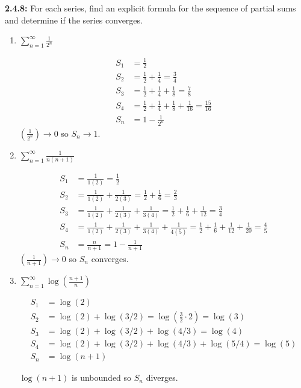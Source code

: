 \documentclass[12pt]{article}
\begin{document}
\textbf{2.4.8:} For each series, find an explicit formula for the sequence of partial sums and determine if the series converges.
\begin{enumerate}
    \item $\sum_{n=1}^{\infty} \frac{1}{2^n}$

        \color{blue}
            \begin{align*}
                S_1 &=  \frac{1}{2}\\
                S_2 &= \frac{1}{2} + \frac{1}{4} = \frac{3}{4}\\
                S_3 &= \frac{1}{2} + \frac{1}{4} + \frac{1}{8} = \frac{7}{8}\\
                S_4 &= \frac{1}{2} + \frac{1}{4} + \frac{1}{8} + \frac{1}{16} = \frac{15}{16}\\
                S_n &= 1 - \frac{1}{2^n}
            \end{align*}
            $(\frac{1}{2^n}) \to 0$ so $S_n \to 1$.
        \color{black}

    \item $\sum_{n=1}^{\infty} \frac{1}{n(n+1)}$
    
        \color{blue}
            \begin{align*}
                S_1 &= \frac{1}{1(2)} = \frac{1}{2}\\
                S_2 &= \frac{1}{1(2)} + \frac{1}{2(3)} = \frac{1}{2} + \frac{1}{6} = \frac{2}{3}\\
                S_3 &= \frac{1}{1(2)} + \frac{1}{2(3)} + \frac{1}{3(4)} = \frac{1}{2} + \frac{1}{6} + \frac{1}{12} = \frac{3}{4}\\
                S_4 &= \frac{1}{1(2)} + \frac{1}{2(3)} + \frac{1}{3(4)} + \frac{1}{4(5)} = \frac{1}{2} + \frac{1}{6} + \frac{1}{12} + \frac{1}{20} = \frac{4}{5}\\
                S_n &= \frac{n}{n+1} = 1 - \frac{1}{n+1}
            \end{align*}
            $(\frac{1}{n+1}) \to 0$ so $S_n$ converges. 
        \color{black}

    \item $\sum_{n=1}^{\infty} \log(\frac{n+1}{n})$
            
        \color{blue}
            \begin{align*}
                S_1 &= \log(2)\\
                S_2 &= \log(2) + \log(3/2) = \log(\frac{3}{2} \cdot 2) = \log(3)\\
                S_3 &= \log(2) + \log(3/2) + \log(4/3) = \log(4)\\
                S_4 &= \log(2) + \log(3/2) + \log(4/3) + \log(5/4) = \log(5)\\
                S_n &= \log(n+1)
            \end{align*}

            $\log(n +1)$ is unbounded so $S_n$ diverges.
        \color{black}
\end{enumerate}
\end{document}
